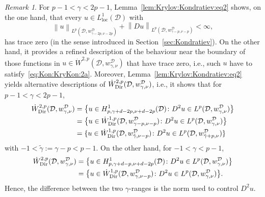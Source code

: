 \documentclass[12pt,a4paper, reqno]{amsart}
\theoremstyle{plain}
\theoremstyle{definition}
\theoremstyle{remark}
\newtheorem{remark}[theorem]{Remark}
\numberwithin{equation}{section}
\newcommand{\1}{\mathbbm{1}}
\newcommand{\calD}{\ensuremath{\mathcal{D}}}
\newcommand{\Dir}{\textup{Dir}}
\newcommand{\nrm}[1]{\left\lVert #1 \right\rVert}
\begin{document}
\begin{remark}\label{rem:Hardy:KK}
For $p-1<\gamma<2p-1$,  Lemma~\ref{lem:Krylov:Kondratiev:eq2} shows, on the one hand, that every $u\in L^1_{\mathrm{loc}}(\calD)$ with
\begin{equation}\label{eq:Kon:KryKon:2a}
\nrm{u}_{L^p(\calD,w_{\gamma-2p,\nu-2p}^\calD)}
+
\nrm{Du}_{L^p(\calD,w_{\gamma-p,\nu-p}^\calD)}
<\infty,
\end{equation}
has trace zero (in the sense introduced in Section~\ref{sec:Kondratiev}).
On the other hand, it provides a refined description of the behaviour near the boundary of those functions in $u\in \Dot{W}^{2,p}(\calD,w_{\gamma,\nu}^\calD)$ that have trace zero, i.e., such $u$ have  to satisfy~\eqref{eq:Kon:KryKon:2a}. 
Moreover, Lemma~\ref{lem:Krylov:Kondratiev:eq2} yields alternative descriptions of $\Dot{W}^{2,p}_\Dir(\calD,w_{\gamma,\nu}^\calD)$, i.e., it shows that for $p-1<\gamma<2p-1$,
\begin{align*}
\Dot{W}^{2,p}_\Dir(\calD,w_{\gamma,\nu}^\calD)
&=
\big\{u\in H^1_{p,\gamma+d-2p,\nu+d-2p}(\calD) \colon D^2u\in L^p(\calD,w_{\gamma,\nu}^\calD)\big\}\\
&=
\big\{u\in \Dot{W}^{1,p}_\Dir(\calD,w_{\gamma-p,\nu-p}^\calD) \colon D^2u\in L^p(\calD,w_{\gamma,\nu}^\calD)\big\}\\
&=\{u\in \Dot W_\Dir^{1,p}(\calD,w_{\tilde\gamma,\nu-p}^\calD)\colon D^2 u \in L^p(\calD,w_{\tilde\gamma+p,\nu}^\calD)\}
\end{align*}
with $-1<\tilde\gamma:=\gamma-p<p-1.$ 
On the other hand, for $-1<\gamma<p-1$,
\begin{align*}
\Dot{W}^{2,p}_\Dir(\calD,w_{\gamma,\nu}^\calD)
&=
\big\{u\in H^1_{p,\gamma+d-p,\nu+d-2p}(\calD) \colon D^2u\in L^p(\calD,w_{\gamma,\nu}^\calD)\big\}\\
&=
\big\{u\in \Dot{W}^{1,p}_\Dir(\calD,w_{\gamma,\nu-p}^\calD) \colon D^2u\in L^p(\calD,w_{\gamma,\nu}^\calD)\big\}.
\end{align*}
Hence, the difference between the two $\gamma$-ranges is the norm used to control $D^2u$. 
  


\end{remark}
\end{document}
